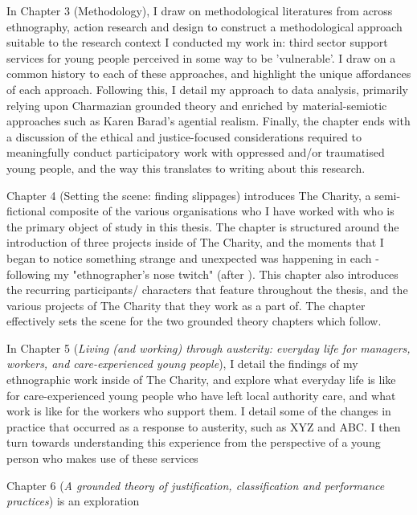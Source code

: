 In Chapter 3 (Methodology), I draw on methodological literatures from across ethnography, action research and design to construct a methodological approach suitable to the research context I conducted my work in: third sector support services for young people perceived in some way to be 'vulnerable'. I draw on a common history to each of these approaches, and highlight the unique affordances of each approach. Following this, I detail my approach to data analysis, primarily relying upon Charmazian grounded theory and enriched by material-semiotic approaches such as Karen Barad's agential realism. Finally, the chapter ends with a discussion of the ethical and justice-focused considerations required to meaningfully conduct participatory work with oppressed and/or traumatised young people, and the way this translates to writing about this research. 

Chapter 4 (Setting the scene: finding slippages) introduces The Charity, a semi-fictional composite of the various organisations who I have worked with who is the primary object of study in this thesis. The chapter is structured around the introduction of three projects inside of The Charity, and the moments that I began to notice something strange and unexpected was happening in each - following my "ethnographer's nose twitch" (after \cite{star_ethnography_1999}). This chapter also introduces the recurring participants/ characters that feature throughout the thesis, and the various projects of The Charity that they work as a part of. The chapter effectively sets the scene for the two grounded theory chapters which follow.

In Chapter 5 (\emph{Living (and working) through austerity: everyday life for managers, workers, and care-experienced young people}), I detail the findings of my ethnographic work inside of The Charity, and explore what everyday life is like for care-experienced young people who have left local authority care, and what work is like for the workers who support them. I detail some of the changes in practice that occurred as a response to austerity, such as XYZ and ABC. I then turn towards understanding this experience from the perspective of a young person who makes use of these services

Chapter 6 (\textit{A grounded theory of justification, classification and performance practices}) is an exploration

